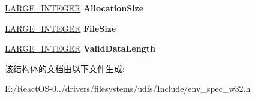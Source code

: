 \begin{DoxyCompactItemize}
\item 
\mbox{\label{struct___f_s_r_t_l___c_o_m_m_o_n___f_c_b___h_e_a_d_e_r_aa2d9ed648d49b849645cbd198da1baba}} 
\hyperlink{union___l_a_r_g_e___i_n_t_e_g_e_r}{L\+A\+R\+G\+E\+\_\+\+I\+N\+T\+E\+G\+ER} {\bfseries Allocation\+Size}
\item 
\mbox{\label{struct___f_s_r_t_l___c_o_m_m_o_n___f_c_b___h_e_a_d_e_r_ac554c0481e7e7b8d90e42792ceff2e4c}} 
\hyperlink{union___l_a_r_g_e___i_n_t_e_g_e_r}{L\+A\+R\+G\+E\+\_\+\+I\+N\+T\+E\+G\+ER} {\bfseries File\+Size}
\item 
\mbox{\label{struct___f_s_r_t_l___c_o_m_m_o_n___f_c_b___h_e_a_d_e_r_af3886781a058c503f18e1a8b7de2cd62}} 
\hyperlink{union___l_a_r_g_e___i_n_t_e_g_e_r}{L\+A\+R\+G\+E\+\_\+\+I\+N\+T\+E\+G\+ER} {\bfseries Valid\+Data\+Length}
\end{DoxyCompactItemize}


该结构体的文档由以下文件生成\+:\begin{DoxyCompactItemize}
\item 
E\+:/\+React\+O\+S-\/0../drivers/filesystems/udfs/\+Include/env\+\_\+spec\+\_\+w32.\+h\end{DoxyCompactItemize}
